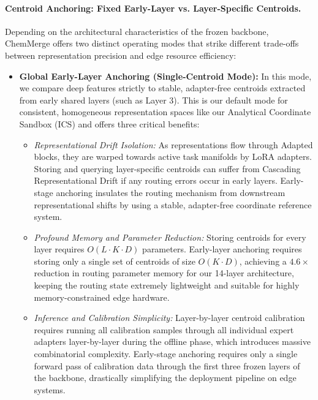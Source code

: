 \paragraph{Centroid Anchoring: Fixed Early-Layer vs. Layer-Specific Centroids.}
Depending on the architectural characteristics of the frozen backbone, ChemMerge offers two distinct operating modes that strike different trade-offs between representation precision and edge resource efficiency:
\begin{itemize}
    \item \textbf{Global Early-Layer Anchoring (Single-Centroid Mode):} In this mode, we compare deep features strictly to stable, adapter-free centroids extracted from early shared layers (such as Layer 3). This is our default mode for consistent, homogeneous representation spaces like our Analytical Coordinate Sandbox (ICS) and offers three critical benefits:
    \begin{itemize}
        \item \emph{Representational Drift Isolation:} As representations flow through Adapted blocks, they are warped towards active task manifolds by LoRA adapters. Storing and querying layer-specific centroids can suffer from Cascading Representational Drift if any routing errors occur in early layers. Early-stage anchoring insulates the routing mechanism from downstream representational shifts by using a stable, adapter-free coordinate reference system.
        \item \emph{Profound Memory and Parameter Reduction:} Storing centroids for every layer requires $O(L \cdot K \cdot D)$ parameters. Early-layer anchoring requires storing only a single set of centroids of size $O(K \cdot D)$, achieving a $4.6\times$ reduction in routing parameter memory for our 14-layer architecture, keeping the routing state extremely lightweight and suitable for highly memory-constrained edge hardware.
        \item \emph{Inference and Calibration Simplicity:} Layer-by-layer centroid calibration requires running all calibration samples through all individual expert adapters layer-by-layer during the offline phase, which introduces massive combinatorial complexity. Early-stage anchoring requires only a single forward pass of calibration data through the first three frozen layers of the backbone, drastically simplifying the deployment pipeline on edge systems.
    \end{itemize}

\end{itemize}
